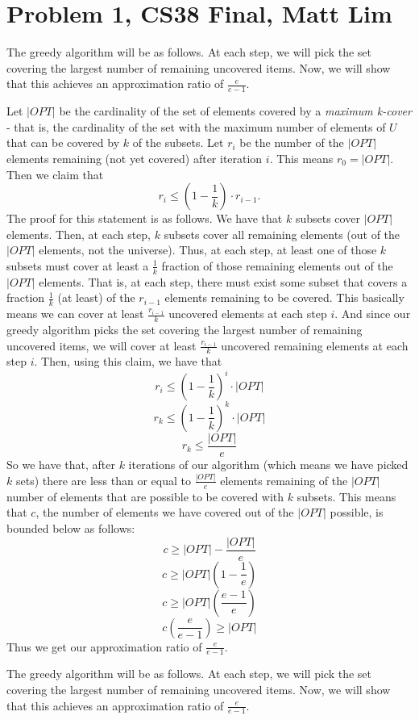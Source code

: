 \documentclass{article}
\begin{document}
\section*{Problem 1, CS38 Final, Matt Lim}
The greedy algorithm will be as follows. At each step, we will pick the set
covering the largest number of remaining uncovered items. Now, we will show that
this achieves an approximation ratio of $\frac{e}{e-1}$.

Let $|OPT|$ be the cardinality of the set of elements covered by a
\textit{maximum k-cover} - that is, the cardinality of the set
with the maximum number of elements of $U$ that can be covered by $k$ of the
subsets. Let $r_i$ be the number of the $|OPT|$ elements remaining (not yet
covered) after iteration $i$. This means $r_0 = |OPT|$. Then we claim that
\[ r_i \leq (1 - \frac{1}{k}) \cdot r_{i-1}. \]
The proof for this statement is as follows. We have
that $k$ subsets cover $|OPT|$ elements. Then, at each step, $k$ subsets cover
all remaining elements (out of the $|OPT|$ elements, not the universe).
Thus, at each step, at least one of those $k$ subsets must cover at least a $\frac{1}{k}$
fraction of those remaining elements out of the $|OPT|$ elements. That is, at
each step, there
must exist some subset that covers a fraction $\frac{1}{k}$ (at least) of the $r_{i-1}$
elements remaining to be covered. This basically means we can cover at least
$\frac{r_{i-1}}{k}$ uncovered elements at each step $i$. And since our
greedy algorithm picks the set covering the largest number of remaining
uncovered items, we will cover at least $\frac{r_{i-1}}{k}$ uncovered remaining
elements at each step $i$. Then, using this claim, we have that
\[ r_i \leq (1 - \frac{1}{k})^i \cdot |OPT| \]
\[ r_k \leq (1 - \frac{1}{k})^k \cdot |OPT| \]
\[ r_k \leq \frac{|OPT|}{e} \]
So we have that, after $k$ iterations of our algorithm (which means we have
picked $k$ sets) there are less than or equal to $\frac{|OPT|}{e}$ elements
remaining of the $|OPT|$ number of elements that are possible to be covered with
$k$ subsets. This means that $c$, the number of elements we have
covered out of the $|OPT|$ possible, is bounded below as follows:
\[ c \geq |OPT| - \frac{|OPT|}{e} \]
\[ c \geq |OPT|(1 - \frac{1}{e}) \]
\[ c \geq |OPT|(\frac{e-1}{e}) \]
\[ c(\frac{e}{e-1}) \geq |OPT| \]
Thus we get our approximation ratio of $\frac{e}{e-1}$.

\vspace{20mm}

The greedy algorithm will be as follows. At each step, we will pick the set
covering the largest number of remaining uncovered items. Now, we will show that
this achieves an approximation ratio of $\frac{e}{e-1}$.
\end{document}
